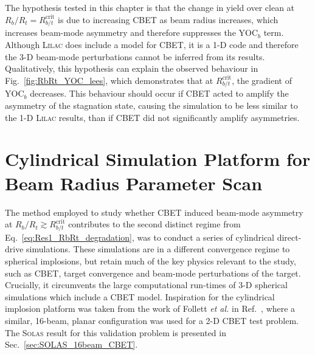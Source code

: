 The hypothesis tested in this chapter is that the change in yield over clean at $R_b/R_t = R_{b/t}^{\text{crit}}$ is due to increasing \ac{CBET} as beam radius increases, which increases beam-mode asymmetry and therefore suppresses the $\text{YOC}_{b}$ term.
Although \textsc{Lilac} does include a model for \ac{CBET}, it is a 1-D code and therefore the 3-D beam-mode perturbations cannot be inferred from its results.
Qualitatively, this hypothesis can explain the observed behaviour in Fig.~\ref{fig:RbRt_YOC_lees}, which demonstrates that at $R_{b/t}^{\text{crit}}$, the gradient of $\text{YOC}_{b}$ decreases.
This behaviour should occur if \ac{CBET} acted to amplify the asymmetry of the stagnation state, causing the simulation to be less similar to the 1-D \textsc{Lilac} results, than if \ac{CBET} did not significantly amplify asymmetries.

\section{Cylindrical Simulation Platform for Beam Radius Parameter Scan}%
\label{sec:Res1_CylRbRt_platform}

The method employed to study whether \ac{CBET} induced beam-mode asymmetry at $R_b/R_t\gtrsim R_{b/t}^{\text{crit}}$ contributes to the second distinct regime from Eq.~\ref{eq:Res1_RbRt_degradation}, was to conduct a series of cylindrical direct-drive simulations.
These simulations are in a different convergence regime to spherical implosions, but retain much of the key physics relevant to the study, such as \ac{CBET}, target convergence and beam-mode perturbations of the target.
Crucially, it circumvents the large computational run-times of 3-D spherical simulations which include a \ac{CBET} model.
Inspiration for the cylindrical implosion platform was taken from the work of Follett \textit{et al.} in Ref.~\cite{follett_validation_2022}, where a similar, 16-beam, planar configuration was used for a 2-D \ac{CBET} test problem.
The \textsc{Solas} result for this validation problem is presented in Sec.~\ref{sec:SOLAS_16beam_CBET}.

